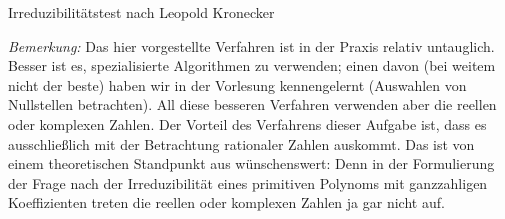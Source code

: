 \documentclass{algblatt}
\begin{document}
\begin{aufgabe}{Irreduzibilitätstest nach Leopold Kronecker}
\begin{loesungE}
\emph{Bemerkung:} Das hier vorgestellte Verfahren ist in der Praxis relativ
untauglich. Besser ist es, spezialisierte Algorithmen zu verwenden; einen davon
(bei weitem nicht der beste) haben wir in der Vorlesung kennengelernt
(Auswahlen von Nullstellen betrachten). All diese besseren Verfahren verwenden
aber die reellen oder komplexen Zahlen. Der Vorteil des Verfahrens dieser
Aufgabe ist, dass es ausschließlich mit der Betrachtung rationaler Zahlen
auskommt. Das ist von einem theoretischen Standpunkt aus wünschenswert: Denn in
der Formulierung der Frage nach der Irreduzibilität eines primitiven Polynoms
mit ganzzahligen Koeffizienten treten die reellen oder komplexen Zahlen ja gar
nicht auf.
\end{loesungE}
\end{aufgabe}
\end{document}
